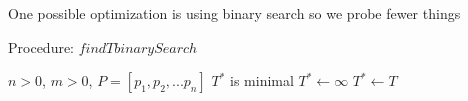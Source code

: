 \documentclass[landscape]{slides}
\begin{document}
\begin{slide}
  One possible optimization is using binary search so we probe fewer things

  Procedure: $findTbinarySearch$
  \begin{algorithmic}
    \REQUIRE $n > 0$, $m > 0$, $P = [p_1, p_2, ... p_n]$
    \ENSURE $T^*$ is minimal
    \STATE $T^* \leftarrow \infty$
        \STATE $T^* \leftarrow T$
      \ENDIF
    \ENDFOR
  \end{algorithmic}
\end{slide}
\end{document}
